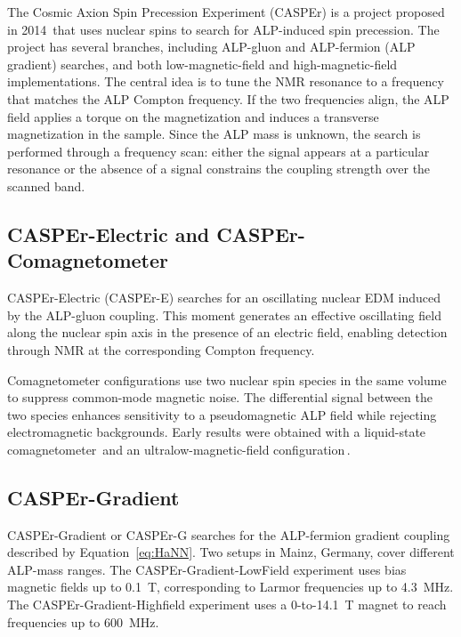 The Cosmic Axion Spin Precession Experiment (CASPEr) is a project proposed in 2014\,\cite{CASPErProposal2014} that uses nuclear spins to search for ALP-induced spin precession.
The project has several branches, including ALP-gluon and ALP-fermion (ALP gradient) searches, and both low-magnetic-field and high-magnetic-field implementations.
The central idea is to tune the NMR resonance to a frequency that matches the ALP Compton frequency.
If the two frequencies align, the ALP field applies a torque on the magnetization and induces a transverse magnetization in the sample.
Since the ALP mass is unknown, the search is performed through a frequency scan: either the signal appears at a particular resonance or the absence of a signal constrains the coupling strength over the scanned band.

\subsection{CASPEr-Electric and CASPEr-Comagnetometer}

CASPEr-Electric (CASPEr-E) searches for an oscillating nuclear EDM induced by the ALP-gluon coupling.
This moment generates an effective oscillating field along the nuclear spin axis in the presence of an electric field, enabling detection through NMR at the corresponding Compton frequency.

Comagnetometer configurations use two nuclear spin species in the same volume to suppress common-mode magnetic noise.
The differential signal between the two species enhances sensitivity to a pseudomagnetic ALP field while rejecting electromagnetic backgrounds.
Early results were obtained with a liquid-state comagnetometer\,\cite{PhysRevLett.122.191302} and an ultralow-magnetic-field configuration\,\cite{CASPEr_ZULF_2019}.

\subsection{CASPEr-Gradient}\label{sec:intro:CASPEr:gradient}
CASPEr-Gradient or CASPEr-G searches for the ALP-fermion gradient coupling described by Equation~\eqref{eq:HaNN}.
Two setups in Mainz, Germany, cover different ALP-mass ranges.
The CASPEr-Gradient-LowField experiment uses bias magnetic fields up to \SI{0.1}{\tesla}, corresponding to Larmor frequencies up to \SI{4.3}{\MHz}.
The CASPEr-Gradient-Highfield experiment uses a 0-to-\SI{14.1}{\tesla} magnet to reach frequencies up to \SI{600}{\MHz}.

